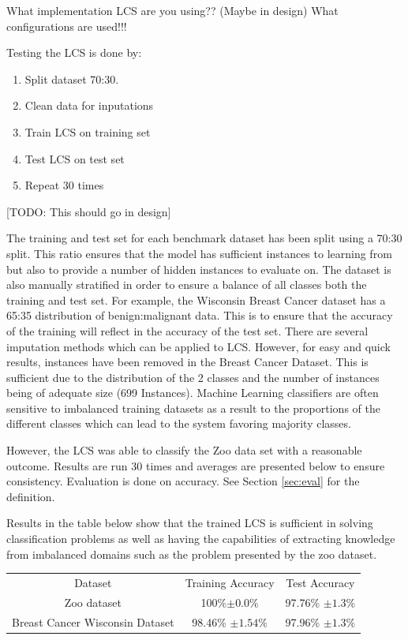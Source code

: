 What implementation LCS are you using?? (Maybe in design)
What configurations are used!!!

Testing the LCS is done by:
\begin{enumerate}
	\item Split dataset 70:30. 
	\item Clean data for inputations
	\item Train LCS on training set
	\item Test LCS on test set
	\item Repeat 30 times
\end{enumerate}

[TODO: This should go in design]

The training and test set for each benchmark dataset has been split using a 70:30 split. This ratio ensures that the model has sufficient instances to learning from but also to provide a number of hidden instances to evaluate on. The dataset is also manually stratified in order to ensure a balance of all classes both the training and test set. For example, the Wisconsin Breast Cancer dataset has a 65:35 distribution of benign:malignant data. This is to ensure that the accuracy of the training will reflect in the accuracy of the test set. There are several imputation methods which can be applied to LCS. However, for easy and quick results, instances have been removed in the Breast Cancer Dataset. This is sufficient due to the distribution of the 2 classes and the number of instances being of adequate size (699 Instances).  Machine Learning classifiers are often sensitive to imbalanced training datasets as a result to the proportions of the different classes which can lead to the system favoring majority classes. 


However, the LCS was able to classify the Zoo data set with a reasonable outcome. Results are run 30 times and averages are presented below to ensure consistency. Evaluation is done on accuracy. See Section \ref{sec:eval} for the definition.

Results in the table below show that the trained LCS is sufficient in solving classification problems as well as having the capabilities of extracting knowledge from imbalanced domains such as the problem presented by the zoo dataset.

\begin{center}
	\begin{tabular}{ |c|c|c| } 
		\hline
		Dataset & Training Accuracy & Test Accuracy \\ 
		Zoo dataset & 100\%$\pm0.0\% $ & 97.76\% $\pm1.3\% $ \\ 
		Breast Cancer Wisconsin Dataset & 98.46\% $ \pm1.54\% $& 97.96\% $ \pm1.3\% $\\ 
		\hline
	\end{tabular}
\end{center}


